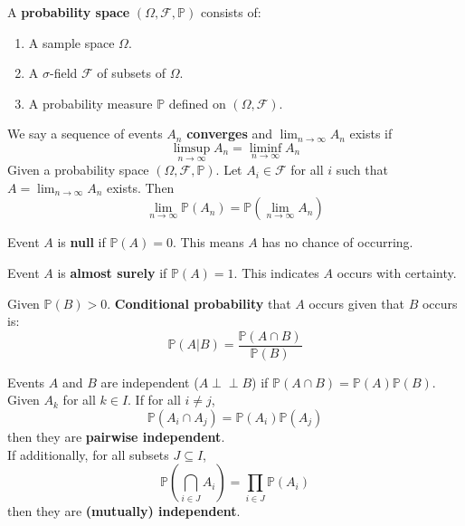 \documentclass{huhtakm-template-book}
\newcommand{\independent}{\perp\!\!\!\perp}
\newcommand{\prob}{\mathbb{P}}
\begin{document}
    \begin{sdefn}
        A \textbf{probability space} $(\Omega,\mathcal{F},\prob)$ consists of:
        \begin{enumerate}
            \item A sample space $\Omega$.
            \item A $\sigma$-field $\mathcal{F}$ of subsets of $\Omega$.
            \item A probability measure $\prob$ defined on $(\Omega,\mathcal{F})$.
        \end{enumerate}
    \end{sdefn}
    \begin{sdefn}
        We say a sequence of events $A_{n}$ \textbf{converges} and $\lim_{n\to\infty}A_{n}$ exists if
        \begin{equation*}
            \limsup_{n\to\infty}A_{n}=\liminf_{n\to\infty}A_{n}
        \end{equation*}
        Given a probability space $(\Omega,\mathcal{F},\prob)$. Let $A_{i}\in\mathcal{F}$ for all $i$ such that $A=\lim_{n\to\infty}A_{n}$ exists. Then
        \begin{equation*}
            \lim_{n\to\infty}\prob(A_{n})=\prob\left(\lim_{n\to\infty}A_{n}\right)
        \end{equation*}
    \end{sdefn}
    \begin{sdefn}
        Event $A$ is \textbf{null} if $\prob(A)=0$. This means $A$ has no chance of occurring.
    \end{sdefn}
    \begin{sdefn}
        Event $A$ is \textbf{almost surely} if $\prob(A)=1$. This indicates $A$ occurs with certainty.
    \end{sdefn}
    \begin{sdefn}
        Given $\prob(B)>0$. \textbf{Conditional probability} that $A$ occurs given that $B$ occurs is:
        \begin{equation*}
            \prob(A|B)=\frac{\prob(A\cap B)}{\prob(B)}
        \end{equation*}
    \end{sdefn}
    \begin{sdefn}
        Events $A$ and $B$ are independent ($A\independent B$) if $\prob(A\cap B)=\prob(A)\prob(B)$.\\
        Given $A_{k}$ for all $k\in I$. If for all $i\neq j$, 
        \begin{equation*}
            \prob(A_{i}\cap A_{j})=\prob(A_{i})\prob(A_{j})
        \end{equation*} 
        then they are \textbf{pairwise independent}.\\
        If additionally, for all subsets $J\subseteq I$,
        \begin{equation*}
            \prob\left(\bigcap_{i\in J}A_{i}\right)=\prod_{i\in J}\prob(A_{i})
        \end{equation*}
        then they are \textbf{(mutually) independent}.
    \end{sdefn}
\end{document}
